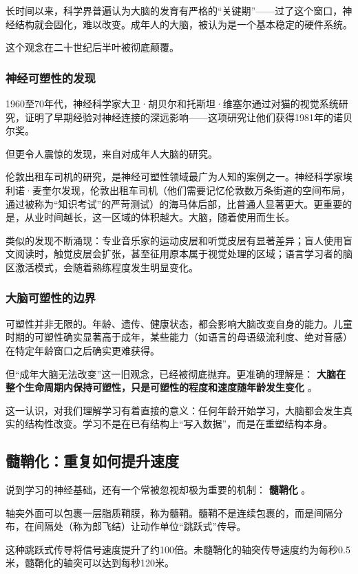 \documentclass[11pt]{article}
\begin{document}
长时间以来，科学界普遍认为大脑的发育有严格的“关键期”——过了这个窗口，神经结构就会固化，难以改变。成年人的大脑，被认为是一个基本稳定的硬件系统。

这个观念在二十世纪后半叶被彻底颠覆。
\subsubsection{神经可塑性的发现}
\label{sec:org2e78896}

1960至70年代，神经科学家大卫·胡贝尔和托斯坦·维塞尔通过对猫的视觉系统研究，证明了早期经验对神经连接的深远影响——这项研究让他们获得1981年的诺贝尔奖。

但更令人震惊的发现，来自对成年人大脑的研究。

伦敦出租车司机的研究，是神经可塑性领域最广为人知的案例之一。神经科学家埃利诺·麦奎尔发现，伦敦出租车司机（他们需要记忆伦敦数万条街道的空间布局，通过被称为“知识考试”的严苛测试）的海马体后部，比普通人显著更大。更重要的是，从业时间越长，这一区域的体积越大。大脑，随着使用而生长。

类似的发现不断涌现：专业音乐家的运动皮层和听觉皮层有显著差异；盲人使用盲文阅读时，触觉皮层会扩张，甚至征用原本属于视觉处理的区域；语言学习者的脑区激活模式，会随着熟练程度发生明显变化。
\subsubsection{大脑可塑性的边界}
\label{sec:org1fcd4cf}

可塑性并非无限的。年龄、遗传、健康状态，都会影响大脑改变自身的能力。儿童时期的可塑性确实显著高于成年，某些能力（如语言的母语级流利度、绝对音感）在特定年龄窗口之后确实更难获得。

但“成年大脑无法改变”这一旧观念，已经被彻底抛弃。更准确的理解是： \textbf{大脑在整个生命周期内保持可塑性，只是可塑性的程度和速度随年龄发生变化} 。

这一认识，对我们理解学习有着直接的意义：任何年龄开始学习，大脑都会发生真实的结构性改变。学习不是在已有结构上“写入数据”，而是在重塑结构本身。
\subsection{髓鞘化：重复如何提升速度}
\label{sec:org65cf055}

说到学习的神经基础，还有一个常被忽视却极为重要的机制： \textbf{髓鞘化} 。

轴突外面可以包裹一层脂质鞘膜，称为髓鞘。髓鞘不是连续包裹的，而是间隔分布，在间隔处（称为郎飞结）让动作单位“跳跃式”传导。

这种跳跃式传导将信号速度提升了约100倍。未髓鞘化的轴突传导速度约为每秒0.5米，髓鞘化的轴突可以达到每秒120米。
\end{document}
